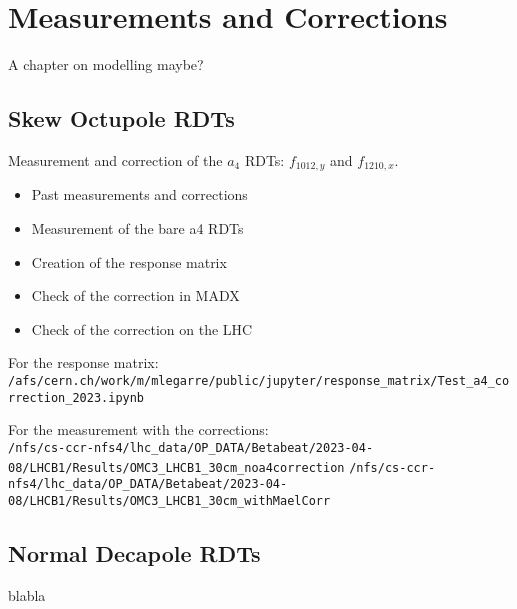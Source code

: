 \section{Measurements and Corrections}


A chapter on modelling maybe?

\subsection{Skew Octupole RDTs}

Measurement and correction of the $a_4$ RDTs: $f_{1012,y}$ and $f_{1210,x}$.

\begin{itemize}
    \item Past measurements and corrections
    \item Measurement of the bare a4 RDTs
    \item Creation of the response matrix
    \item Check of the correction in MADX
    \item Check of the correction on the LHC
\end{itemize}

For the response matrix: \\
\footnotesize
\verb|/afs/cern.ch/work/m/mlegarre/public/jupyter/response_matrix/Test_a4_correction_2023.ipynb|
\normalsize

For the measurement with the corrections: \\
\footnotesize
\verb|/nfs/cs-ccr-nfs4/lhc_data/OP_DATA/Betabeat/2023-04-08/LHCB1/Results/OMC3_LHCB1_30cm_noa4correction|
\verb|/nfs/cs-ccr-nfs4/lhc_data/OP_DATA/Betabeat/2023-04-08/LHCB1/Results/OMC3_LHCB1_30cm_withMaelCorr|
\normalsize


\subsection{Normal Decapole RDTs}

blabla